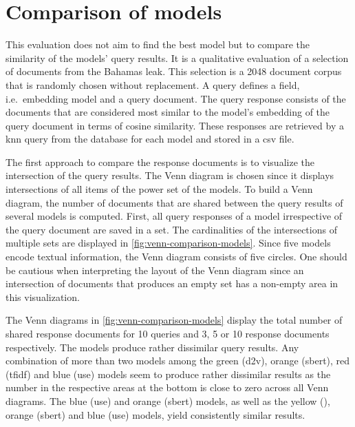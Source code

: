 \section{Comparison of models}\label{sec:evaluation-models}


This evaluation does not aim to find the best model but to compare the similarity of the models' query results.
It is a qualitative evaluation of a selection of documents from the Bahamas leak.
This selection is a 2048 document corpus that is randomly chosen without replacement.
A query defines a field, i.e.\ embedding model and a query document.
The query response consists of the documents that are considered most similar to the model's embedding of the query document in terms of cosine similarity.
These responses are retrieved by a \ac{knn} query from the database for each model and stored in a \ac{csv} file.

The first approach to compare the response documents is to visualize the intersection of the query results.
The Venn diagram is chosen since it displays intersections of all items of the power set of the models.
To build a Venn diagram, the number of documents that are shared between the query results of several models is computed.
First, all query responses of a model irrespective of the query document are saved in a set.
The cardinalities of the intersections of multiple sets are displayed in \autoref{fig:venn-comparison-models}.
Since five models encode textual information, the Venn diagram consists of five circles.
One should be cautious when interpreting the layout of the Venn diagram since 
an intersection of documents that produces an empty set has a non-empty area in this visualization.

The Venn diagrams in \autoref{fig:venn-comparison-models} display the total number of shared response documents for 10 queries 
and 3, 5 or 10 response documents respectively.
The models produce rather dissimilar query results.
Any combination of more than two models among the green (\ac{d2v}), orange (\ac{sbert}), red (\ac{tfidf}) and blue (\ac{use}) models 
seem to produce rather dissimilar results 
as the number in the respective areas at the bottom is close to zero across all Venn diagrams.
The blue (\ac{use}) and orange (\ac{sbert}) models, as well as the yellow (\infersent{}), orange (\ac{sbert}) and blue (\ac{use}) models, 
yield consistently similar results.

